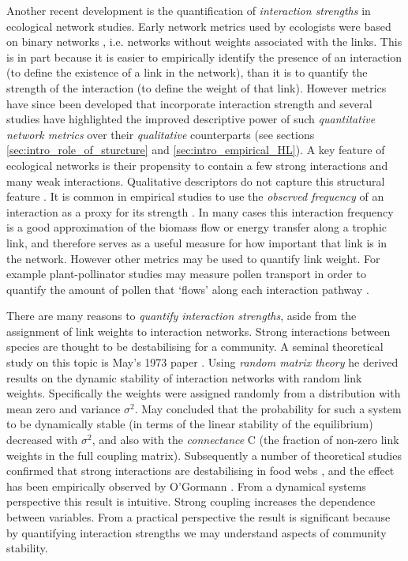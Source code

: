 Another recent development is the quantification of \emph{interaction strengths} in ecological network studies. Early network metrics used by ecologists were based on binary networks \cite{bersier2002quantitative}, i.e. networks without weights associated with the links. This is in part because it is easier to empirically identify the presence of an interaction (to define the existence of a link in the network), than it is to quantify the strength of the interaction (to define the weight of that link). However metrics have since been developed that incorporate interaction strength \cite{bersier2002quantitative,bluthgen2008interaction,bluthgen2006measuring} and several studies have highlighted the improved descriptive power of such \emph{quantitative network metrics} over their \emph{qualitative} counterparts (see sections \ref{sec:intro_role_of_sturcture} and \ref{sec:intro_empirical_HL}). A key feature of ecological networks is their propensity to contain a few strong interactions and many weak interactions. Qualitative descriptors do not capture this structural feature \cite{bersier2002quantitative}. It is common in empirical studies to use the \emph{observed frequency} of an interaction as a proxy for its strength \cite{bluthgen2008interaction,berlow2004interaction}. In many cases this interaction frequency is a good approximation of the biomass flow or energy transfer along a trophic link, and therefore serves as a useful measure for how important that link is in the network. However other metrics may be used to quantify link weight. For example plant-pollinator studies may measure pollen transport in order to quantify the amount of pollen that `flows' along each interaction pathway \cite{devoto2011night}.  

There are many reasons to \emph{quantify interaction strengths}, aside from the assignment of link weights to interaction networks. Strong interactions between species are thought to be destabilising for a community. A seminal theoretical study on this topic is May's 1973 paper \cite{may1972will}. Using \emph{random matrix theory} he derived results on the dynamic stability of interaction networks with random link weights. Specifically the weights were assigned randomly from a distribution with mean zero and variance $\sigma^2$. May concluded that the probability for such a system to be dynamically stable (in terms of the linear stability of the equilibrium) decreased with $\sigma^2$, and also with the \emph{connectance} C (the fraction of non-zero link weights in the full coupling matrix). Subsequently a number of theoretical studies confirmed that strong interactions are destabilising in food webs \cite{mccann1998weak,gross2009generalized}, and the effect has been empirically observed by O'Gormann \cite{o2009perturbations}.  From a dynamical systems perspective this result is intuitive. Strong coupling increases the dependence between variables. From a practical perspective the result is significant because by quantifying interaction strengths we may understand aspects of community stability. 


